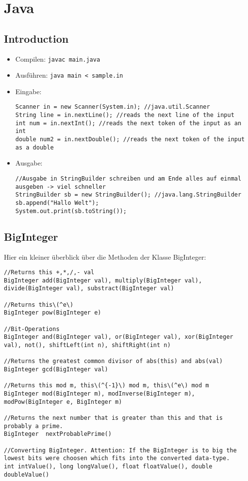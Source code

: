 \section{Java}
\lstset{language=Java}

\subsection{Introduction}

\begin{itemize}
\item Compilen: \lstinline{javac main.java}
\item Ausführen: \lstinline{java main < sample.in}
\item Eingabe:
\begin{lstlisting}
Scanner in = new Scanner(System.in); //java.util.Scanner
String line = in.nextLine(); //reads the next line of the input
int num = in.nextInt(); //reads the next token of the input as an int
double num2 = in.nextDouble(); //reads the next token of the input as a double
\end{lstlisting}
\item Ausgabe:
\begin{lstlisting}
//Ausgabe in StringBuilder schreiben und am Ende alles auf einmal ausgeben -> viel schneller
StringBuilder sb = new StringBuilder(); //java.lang.StringBuilder
sb.append("Hallo Welt");
System.out.print(sb.toString());
\end{lstlisting}
\end{itemize}

\subsection{BigInteger}
Hier ein kleiner überblick über die Methoden der Klasse BigInteger:
\begin{lstlisting}
//Returns this +,*,/,- val
BigInteger add(BigInteger val), multiply(BigInteger val), divide(BigInteger val), substract(BigInteger val)

//Returns this\(^e\)
BigInteger pow(BigInteger e)

//Bit-Operations
BigInteger and(BigInteger val), or(BigInteger val), xor(BigInteger val), not(), shiftLeft(int n), shiftRight(int n)

//Returns the greatest common divisor of abs(this) and abs(val)
BigInteger gcd(BigInteger val)

//Returns this mod m, this\(^{-1}\) mod m, this\(^e\) mod m
BigInteger mod(BigInteger m), modInverse(BigInteger m), modPow(BigInteger e, BigInteger m)

//Returns the next number that is greater than this and that is probably a prime.
BigInteger  nextProbablePrime()

//Converting BigInteger. Attention: If the BigInteger is to big the lowest bits were choosen which fits into the converted data-type.
int intValue(), long longValue(), float floatValue(), double doubleValue() 
\end{lstlisting}
\lstset{language=C++}